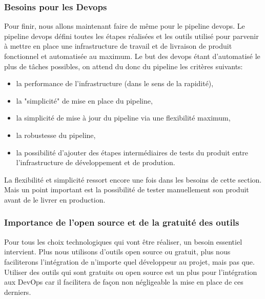 \documentclass[
    iai, %
    il, %
]{heig-tb}
\begin{document}
\subsubsection{Besoins pour les Devops}
Pour finir, nous allons maintenant faire de même pour le pipeline \Gls{devops}.
Le pipeline \Gls{devops} défini toutes les étapes réalisées et les outils utilisé pour parvenir à mettre en place une infrastructure de travail et de livraison de produit fonctionnel et automatisée au maximum.
Le but des \Gls{devops} étant d'automatisé le plus de tâches possibles, on attend du donc du pipeline les critères suivants:
\begin{itemize}
    \item la performance de l'infrastructure (dans le sens de la rapidité),
    \item la "simplicité" de mise en place du pipeline,
    \item la simplicité de mise à jour du pipeline via une flexibilité maximum,
    \item la robustesse du pipeline,
    \item la possibilité d'ajouter des étapes intermédiaires de tests du produit entre l'infrastructure de développement et de prodution.
\end{itemize}

La flexibilité et simplicité ressort encore une fois dans les besoins de cette section.
Mais un point important est la possibilité de tester manuellement son produit avant de le livrer en production.

\subsubsection{Importance de l'open source et de la gratuité des outils}
Pour tous les choix technologiques qui vont être réaliser, un besoin essentiel intervient.
Plus nous utilisons d'outils open source ou gratuit, plus nous faciliterons l'intégration de n'importe quel développeur au projet, mais pas que.
Utiliser des outils qui sont gratuits ou open source est un plus pour l'intégration aux DevOps car il facilitera de façon non négligeable la mise en place de ces derniers.

\end{document}
